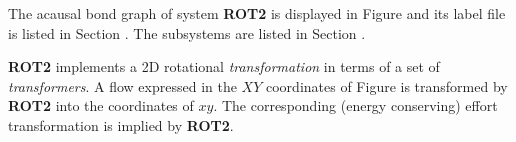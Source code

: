 

   The acausal bond graph of system \textbf{ROT2} is
   displayed in Figure  and its label
   file is listed in Section .
   The subsystems are listed in Section .

\textbf{ROT2} implements a 2D rotational {\em transformation\/} in
terms of a set of {\em transformers}. A flow expressed in the $XY$
coordinates of Figure  is transformed by \textbf{ROT2}
into the coordinates of $xy$. The corresponding (energy conserving)
effort transformation is implied by \textbf{ROT2}.
